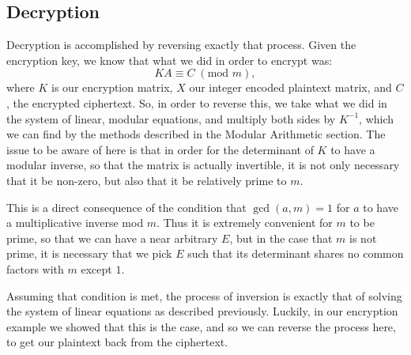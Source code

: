 \documentclass{article}
\begin{document}
\subsection{Decryption}
Decryption is accomplished by reversing exactly that process. Given the encryption key, we know that what we did in order to encrypt was:
\[
    K A \equiv C \; (\text{mod } m),
\]
where $K$ is our encryption matrix, $X$ our integer encoded plaintext matrix, and $C$, the encrypted ciphertext. So, in order to reverse this, we take what we did in the system of linear, modular equations, and multiply both sides by $K^{-1}$, which we can find by the methods described in the Modular Arithmetic section. The issue to be aware of here is that in order for the determinant of $K$ to have a modular inverse, so that the matrix is actually invertible, it is not only necessary that it be non-zero, but also that it be relatively prime to $m$. \medskip

\noindent This is a direct consequence of the condition that $\gcd(a, m) = 1$ for $a$ to have a multiplicative inverse mod $m$. Thus it is extremely convenient for $m$ to be prime, so that we can have a near arbitrary $E$, but in the case that $m$ is not prime, it is necessary that we pick $E$ such that its determinant shares no common factors with $m$ except $1$. \medskip

\noindent Assuming that condition is met, the process of inversion is exactly that of solving the system of linear equations as described previously. Luckily, in our encryption example we showed that this is the case, and so we can reverse the process here, to get our plaintext back from the ciphertext. \medskip
\end{document}
